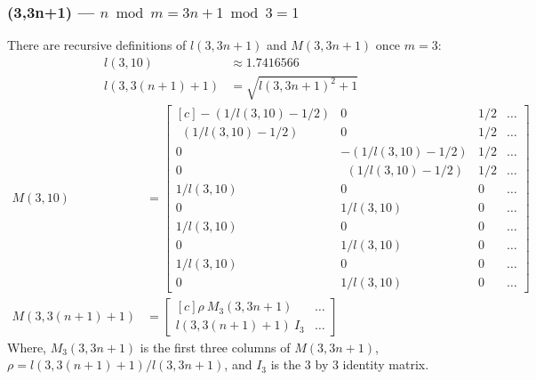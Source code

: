 \documentclass[12pt,titlepage]{article}
\begin{document}
\subsubsection{(3,3n+1) --- $n \bmod m = 3n+1 \bmod 3 = 1$}
There are recursive definitions of $l(3,3n+1)$ and $M(3,3n+1)$ once $m =
3$:
\begin{align*}
l(3,10)       &\approx 1.7416566        \\
l(3,3(n+1)+1) &= \sqrt{l(3,3n+1)^2 + 1}
\end{align*}
\begin{align*}
M(3,10) &=
\begin{bmatrix*}[c]
 -(1/l(3,10) - 1/2) & 0                 & 1/2 & \ldots \\
~~(1/l(3,10) - 1/2) & 0                 & 1/2 & \ldots \\
0                 &  -(1/l(3,10) - 1/2) & 1/2 & \ldots \\
0                 & ~~(1/l(3,10) - 1/2) & 1/2 & \ldots \\
1/l(3,10)           & 0                 & 0   & \ldots \\
0                 & 1/l(3,10)           & 0   & \ldots \\
1/l(3,10)           & 0                 & 0   & \ldots \\
0                 & 1/l(3,10)           & 0   & \ldots \\
1/l(3,10)           & 0                 & 0   & \ldots \\
0                 & 1/l(3,10)           & 0   & \ldots 
\end{bmatrix*} \\
M(3,3(n+1)+1) &=
\begin{bmatrix*}[c]
\rho~M_3(3,3n+1)  & \ldots \\
l(3,3(n+1)+1)~I_3 & \ldots
\end{bmatrix*}
\end{align*}
Where, $M_3(3,3n+1)$ is the first three columns of $M(3,3n+1)$,
$\rho = l(3,3(n+1)+1)/l(3,3n+1)$, and $I_3$ is the 3 by 3 identity matrix.
\end{document}
